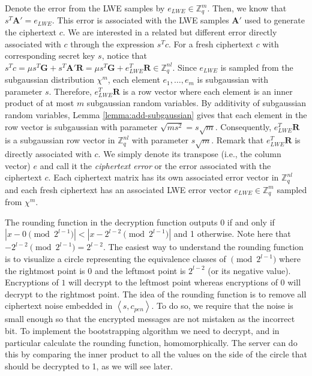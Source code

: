 Denote the error from the LWE samples by $e_{LWE} \in \mathbb{Z}_q^m$. Then, we know that $s^T\mathbf{A}' = e_{LWE}$. This error is associated with the LWE samples $\mathbf{A}'$ used to generate the ciphertext $c$. We are interested in a related but different error directly associated with $c$ through the expression $s^Tc$.
For a fresh ciphertext $c$ with corresponding secret key $s$, notice that $s^Tc = \mu s^T\mathbf{G} + s^T\mathbf{A}'\mathbf{R} = \mu s^T\mathbf{G} + e_{LWE}^T\mathbf{R} \in \mathbb{Z}_q^{nl}$. Since $e_{LWE}$ is sampled from the subgaussian distribution $\chi^m$, each element $e_1, \dots, e_m$ is subgaussian with parameter $s$. Therefore, $e_{LWE}^T\mathbf{R}$ is a row vector where each element is an inner product of at most $m$ subgaussian random variables. By additivity of subgaussian random variables, Lemma \ref{lemma:add-subgaussian} gives that each element in the row vector is subgaussian with parameter $\sqrt{ms^2} = s\sqrt{m}$. Consequently, $e_{LWE}^T\mathbf{R}$ is a subgaussian row vector in $\mathbb{Z}_q^{nl}$ with parameter $s\sqrt{m}$. Remark that $e_{LWE}^T\mathbf{R}$ is directly associated with $c$. We simply denote its transpose (i.e., the column vector) $e$ and call it the \textit{ciphertext error} or the error associated with the ciphertext $c$. Each ciphertext matrix has its own associated error vector in $\mathbb{Z}_q^{nl}$ and each fresh ciphertext has an associated LWE error vector $e_{LWE} \in \mathbb{Z}_q^{m}$ sampled from $\chi^m$. 

The rounding function in the decryption function outputs $0$ if and only if $|x - 0 \pmod {2^{l-1}}| < |x - 2^{l-2} \pmod {2^{l-1}}|$ and 1 otherwise. Note here that $-2^{l-2} \pmod {2^{l-1}} = 2^{l-2}$. The easiest way to understand the rounding function is to visualize a circle representing the equivalence classes of $\pmod {2^{l-1}}$ where the rightmost point is $0$ and the leftmost point is $2^{l-2}$ (or its negative value). Encryptions of $1$ will decrypt to the leftmost point whereas encryptions of $0$ will decrypt to the rightmost point. The idea of the rounding function is to remove all ciphertext noise embedded in $\left \langle s,c_{pen} \right \rangle$. To do so, we require that the noise is small enough so that the encrypted messages are not mistaken as the incorrect bit. To implement the bootstrapping algorithm we need to decrypt, and in particular calculate the rounding function, homomorphically. The server can do this by comparing the inner product to all the values on the side of the circle that should be decrypted to 1, as we will see later.

